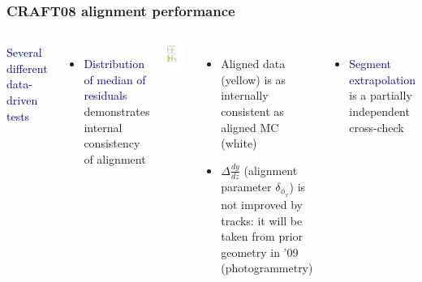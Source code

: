 \documentclass[compress]{beamer}
\begin{document}
\begin{frame}
\frametitle{CRAFT08 alignment performance}

\begin{columns}

\textcolor{darkblue}{Several different data-driven tests}

\vspace{0.25 cm}
\scriptsize
\begin{itemize}
\item \textcolor{darkblue}{Distribution of median of residuals} demonstrates internal consistency of alignment
\end{itemize}

\includegraphics[height=\linewidth, angle=90]{statscheck_medians.pdf}

\begin{itemize}
\item Aligned data (yellow) is as internally consistent as aligned MC (white)
\item $\Delta \frac{dy}{dz}$ (alignment parameter $\delta_{\phi_x}$) is not improved by tracks: it will be taken from prior geometry in '09 (photogrammetry)
\end{itemize}

\scriptsize

\begin{itemize}
\item \textcolor{darkblue}{Segment extrapolation} is a partially independent cross-check
\end{itemize}


\end{columns}
\end{frame}
\end{document}
